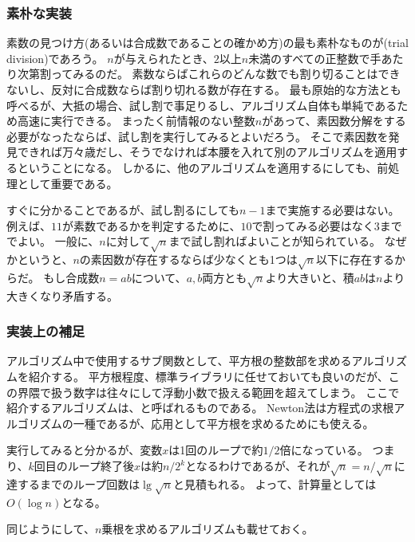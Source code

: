 \subsubsection{素朴な実装}
素数の見つけ方(あるいは合成数であることの確かめ方)の最も素朴なものが(trial division)であろう。
$n$が与えられたとき、$2$以上$n$未満のすべての正整数で手あたり次第割ってみるのだ。
素数ならばこれらのどんな数でも割り切ることはできないし、反対に合成数ならば割り切れる数が存在する。
最も原始的な方法とも呼べるが、大抵の場合、試し割で事足りるし、アルゴリズム自体も単純であるため高速に実行できる。
まったく前情報のない整数$n$があって、素因数分解をする必要がなったならば、試し割を実行してみるとよいだろう。
そこで素因数を発見できれば万々歳だし、そうでなければ本腰を入れて別のアルゴリズムを適用するということになる。
しかるに、他のアルゴリズムを適用するにしても、前処理として重要である。

すぐに分かることであるが、試し割るにしても$n-1$まで実施する必要はない。
例えば、$11$が素数であるかを判定するために、$10$で割ってみる必要はなく$3$まででよい。
一般に、$n$に対して$\sqrt{n}$まで試し割ればよいことが知られている。
なぜかというと、$n$の素因数が存在するならば少なくとも1つは$\sqrt{n}$以下に存在するからだ。
もし合成数$n=ab$について、$a,b$両方とも$\sqrt{n}$より大きいと、積$ab$は$n$より大きくなり矛盾する。


\subsubsection{実装上の補足}
アルゴリズム中で使用するサブ関数として、平方根の整数部を求めるアルゴリズムを紹介する。
平方根程度、標準ライブラリに任せておいても良いのだが、この界隈で扱う数字は往々にして浮動小数で扱える範囲を超えてしまう。
ここで紹介するアルゴリズムは、と呼ばれるものである。
Newton法は方程式の求根アルゴリズムの一種であるが、応用として平方根を求めるためにも使える。

実行してみると分かるが、変数$x$は1回のループで約$1/2$倍になっている。
つまり、$k$回目のループ終了後$x$は約$n/2^k$となるわけであるが、それが$\sqrt{n}=n/\sqrt{n}$に達するまでのループ回数は$\lg\sqrt{n}$と見積もれる。
よって、計算量としては$O(\log{n})$となる。


同じようにして、$n$乗根を求めるアルゴリズムも載せておく。


